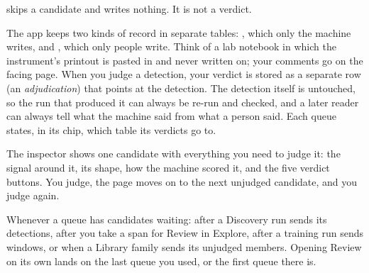  skips a candidate and writes nothing. It is not a verdict.

\begin{plainterms}
The app keeps two kinds of record in separate tables: , which only
the machine writes, and , which only people write. Think of a
lab notebook in which the instrument's printout is pasted in and never written on; your
comments go on the facing page. When you judge a detection, your verdict is stored as a
separate row (an \emph{adjudication}) that points at the detection. The detection itself
is untouched, so the run that produced it can always be re-run and checked, and a later
reader can always tell what the machine said from what a person said. Each queue states,
in its  chip, which table its verdicts go to.
\end{plainterms}

The inspector shows one candidate with everything you need to judge it: the signal around
it, its shape, how the machine scored it, and the five verdict buttons. You judge, the page
moves on to the next unjudged candidate, and you judge again.

Whenever a queue has candidates waiting: after a Discovery run sends its detections, after
you take a span for Review in Explore, after a training run sends windows, or when a Library
family sends its unjudged members.  Opening Review on its own lands on the last queue you used, or
the first queue there is.


